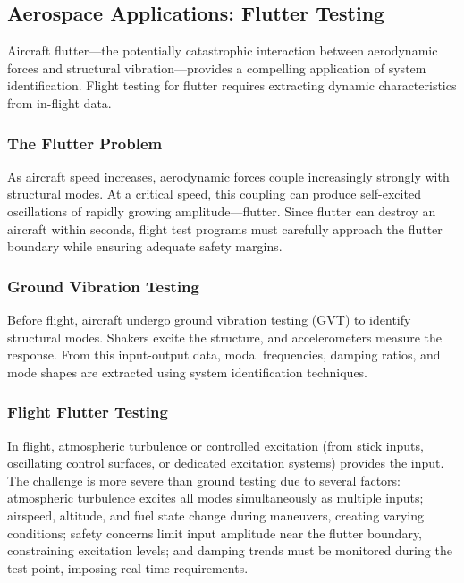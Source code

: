 \subsection{Aerospace Applications: Flutter Testing}
\label{subsec:flutter}

Aircraft flutter---the potentially catastrophic interaction between aerodynamic forces and structural vibration---provides a compelling application of system identification. Flight testing for flutter requires extracting dynamic characteristics from in-flight data.

\subsubsection{The Flutter Problem}

As aircraft speed increases, aerodynamic forces couple increasingly strongly with structural modes. At a critical speed, this coupling can produce self-excited oscillations of rapidly growing amplitude---flutter. Since flutter can destroy an aircraft within seconds, flight test programs must carefully approach the flutter boundary while ensuring adequate safety margins.

\subsubsection{Ground Vibration Testing}

Before flight, aircraft undergo ground vibration testing (GVT) to identify structural modes. Shakers excite the structure, and accelerometers measure the response. From this input-output data, modal frequencies, damping ratios, and mode shapes are extracted using system identification techniques.

\subsubsection{Flight Flutter Testing}

In flight, atmospheric turbulence or controlled excitation (from stick inputs, oscillating control surfaces, or dedicated excitation systems) provides the input. The challenge is more severe than ground testing due to several factors: atmospheric turbulence excites all modes simultaneously as multiple inputs; airspeed, altitude, and fuel state change during maneuvers, creating varying conditions; safety concerns limit input amplitude near the flutter boundary, constraining excitation levels; and damping trends must be monitored during the test point, imposing real-time requirements.

